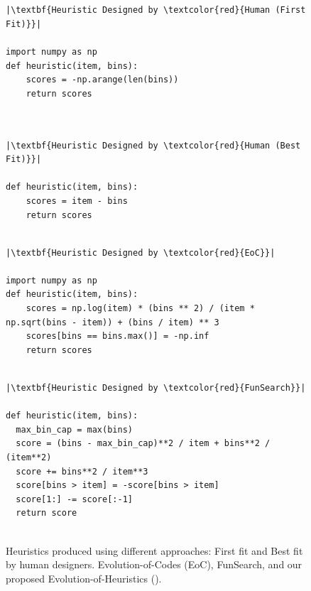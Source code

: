 \begin{figure}[htbp]
\caption{Heuristics produced using different approaches: First fit and Best fit by human designers. Evolution-of-Codes (EoC), FunSearch, and our proposed Evolution-of-Heuristics (\ourmethod{}). }~\label{fig:heuristics_bp}
\begin{minipage}{0.48\linewidth}
\begin{lstlisting}

|\textbf{Heuristic Designed by \textcolor{red}{Human (First Fit)}}|

import numpy as np
def heuristic(item, bins):
    scores = -np.arange(len(bins))
    return scores
    
\end{lstlisting}
\end{minipage}\hfill
\begin{minipage}{0.48\linewidth}
\begin{lstlisting}

|\textbf{Heuristic Designed by \textcolor{red}{Human (Best Fit)}}|

def heuristic(item, bins):
    scores = item - bins
    return scores

\end{lstlisting}
\end{minipage}\hfill
\begin{minipage}{0.48\linewidth}
\begin{lstlisting}

|\textbf{Heuristic Designed by \textcolor{red}{EoC}}|

import numpy as np
def heuristic(item, bins):
    scores = np.log(item) * (bins ** 2) / (item * np.sqrt(bins - item)) + (bins / item) ** 3
    scores[bins == bins.max()] = -np.inf
    return scores

\end{lstlisting}
\end{minipage}\hfill
\begin{minipage}{0.48\linewidth}
\begin{lstlisting}

|\textbf{Heuristic Designed by \textcolor{red}{FunSearch}}|

def heuristic(item, bins):
  max_bin_cap = max(bins)
  score = (bins - max_bin_cap)**2 / item + bins**2 / (item**2)
  score += bins**2 / item**3
  score[bins > item] = -score[bins > item]
  score[1:] -= score[:-1]
  return score
  
\end{lstlisting}
\end{minipage}\hfill


\end{figure}
